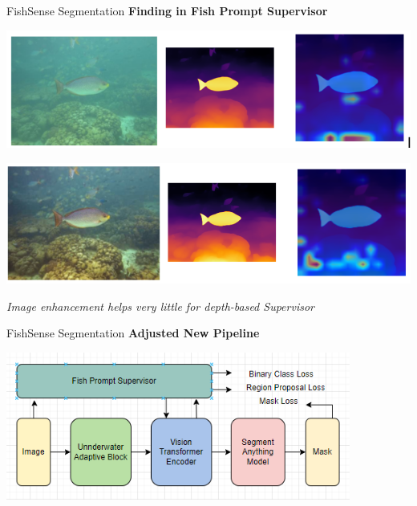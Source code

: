 \begin{frame}{FishSense Segmentation}
    \centering
    \textbf{Finding in Fish Prompt Supervisor}

    \vspace{0.3cm} %

    \begin{minipage}{0.48\textwidth}
        \centering
        \includegraphics[width=\textwidth]{images/fs_depth_1.png}\\
    \end{minipage}
    \hfill
    \begin{minipage}{0.48\textwidth}
        \centering
        \includegraphics[width=\textwidth]{images/fs_depth_2.png}\\
    \end{minipage}

    \vspace{0.3cm} %

    \textit{Image enhancement helps very little for depth-based Supervisor}
\end{frame}

\begin{frame}{FishSense Segmentation}
    \centering
    \textbf{Adjusted New Pipeline}

    \vspace{0.3cm} %

    \includegraphics[width=0.85\textwidth,keepaspectratio]{images/fs_seg_pipeline4.png}
\end{frame}
